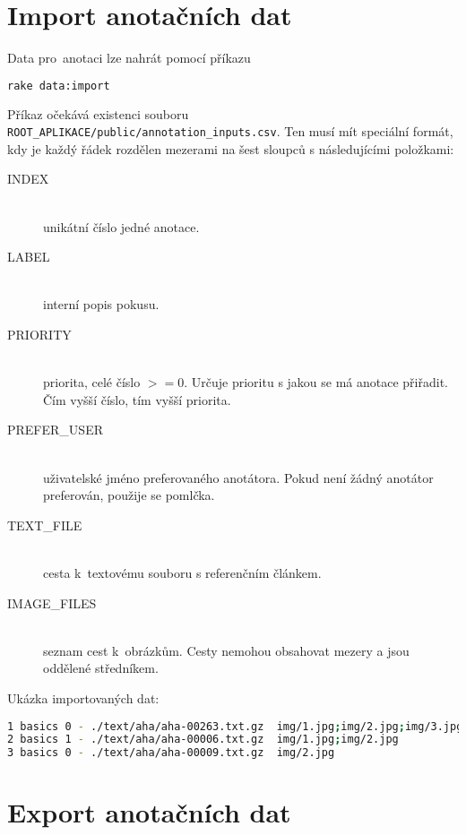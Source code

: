 \section{Import anotačních dat}

Data pro~anotaci lze nahrát pomocí příkazu

\begin{lstlisting}[language=bash]
rake data:import
\end{lstlisting}

Příkaz očekává existenci souboru\\\lstinline{ROOT_APLIKACE/public/annotation_inputs.csv}. Ten musí mít speciální formát, kdy je každý řádek rozdělen mezerami na šest sloupců s následujícími položkami:

\begin{description}

\item[INDEX] \hfill \\
  unikátní číslo jedné anotace.
\item[LABEL] \hfill \\
 interní popis pokusu.
\item[PRIORITY] \hfill \\
 priorita, celé číslo $>= 0$. Určuje prioritu s jakou se má anotace přiřadit. Čím vyšší číslo, tím vyšší priorita.

\item[PREFER\_USER] \hfill \\
 uživatelské jméno preferovaného anotátora. Pokud není žádný anotátor preferován, použije se pomlčka.
\item[TEXT\_FILE] \hfill \\
 cesta k~textovému souboru s referenčním článkem.
\item[IMAGE\_FILES] \hfill \\
 seznam cest k~obrázkům. Cesty nemohou obsahovat mezery a jsou oddělené středníkem.
\end{description}

Ukázka importovaných dat:

\begin{lstlisting}[language=bash]
1 basics 0 - ./text/aha/aha-00263.txt.gz  img/1.jpg;img/2.jpg;img/3.jpg
2 basics 1 - ./text/aha/aha-00006.txt.gz  img/1.jpg;img/2.jpg
3 basics 0 - ./text/aha/aha-00009.txt.gz  img/2.jpg
\end{lstlisting}

\section{Export anotačních dat}

